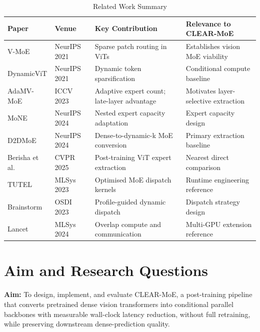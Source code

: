 \documentclass[conference]{IEEEtran}
\begin{document}
\begin{table}[htbp]
\caption{Related Work Summary}
\label{tab:litreview}
\begin{center}
\small
\begin{tabular}{p{1.6cm}p{1.0cm}p{2.0cm}p{2.0cm}}
\toprule
\textbf{Paper} & \textbf{Venue} & \textbf{Key Contribution} & \textbf{Relevance to CLEAR-MoE} \\
\midrule
V-MoE \cite{riquelme2021vmoe} & NeurIPS 2021 & Sparse patch routing in ViTs & Establishes vision MoE viability \\
\hline
DynamicViT \cite{rao2021dynamicvit} & NeurIPS 2021 & Dynamic token sparsification & Conditional compute baseline \\
\hline
AdaMV-MoE \cite{chen2023adamvmoe} & ICCV 2023 & Adaptive expert count; late-layer advantage & Motivates layer-selective extraction \\
\hline
MoNE \cite{mone2024} & NeurIPS 2024 & Nested expert capacity adaptation & Expert capacity design \\
\hline
D2DMoE \cite{d2dmoe2024} & NeurIPS 2024 & Dense-to-dynamic-k MoE conversion & Primary extraction baseline \\
\hline
Berisha et al. \cite{berisha2025cvpr} & CVPR 2025 & Post-training ViT expert extraction & Nearest direct comparison \\
\hline
TUTEL \cite{hwang2023tutel} & MLSys 2023 & Optimised MoE dispatch kernels & Runtime engineering reference \\
\hline
Brainstorm \cite{brainstorm2023} & OSDI 2023 & Profile-guided dynamic dispatch & Dispatch strategy design \\
\hline
Lancet \cite{lancet2024} & MLSys 2024 & Overlap compute and communication & Multi-GPU extension reference \\
\bottomrule
\end{tabular}
\end{center}
\end{table}

\section{Aim and Research Questions}
\label{sec:aim}

\textbf{Aim:} To design, implement, and evaluate CLEAR-MoE, a post-training pipeline that converts pretrained dense vision transformers into conditional parallel backbones with measurable wall-clock latency reduction, without full retraining, while preserving downstream dense-prediction quality.
\end{document}
